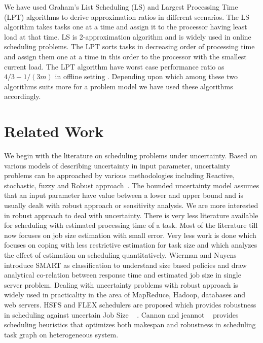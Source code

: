 \documentclass[10pt, conference, compsocconf]{IEEEtran}
\begin{document}
We have used  Graham's List Scheduling (LS) and Largest Processing Time (LPT) algorithms to derive approximation ratios in different scenarios. The LS algorithm takes tasks one at a time and assign  it to the processor having least load at that time. LS is 2-approximation algorithm and is widely used in online scheduling problems.  The LPT sorts tasks in decreasing order of processing time and assign them one at a time in this order to the processor with the smallest current load. The LPT algorithm have worst case performance ratio as $4/3-1/(3m) $ in offline setting
. Depending upon which among these two algorithms suits more for a problem model we have used these algorithms accordingly.

\section{Related Work}
We begin with the literature on scheduling problems under uncertainty. Based on various models of describing uncertainty in input parameter, uncertainty problems can be approached by various methodologies including Reactive, stochastic, fuzzy and Robust approach~\cite{DBLP:journals/cce/LiI08}. The bounded uncertainty model assumes that an input parameter have value between a lower and upper bound and is usually dealt with robust approach or sensitivity analysis. We are more interested in robust approach to deal with uncertainty. There is very less literature available for scheduling with estimated processing time of a task. Most of the literature till now focuses on job size estimation with small error. Very less work is done which focuses on coping with less restrictive estimation for task size and which analyzes the effect of estimation on scheduling quantitatively. Wierman and Nuyens~\cite{conf/sigmetrics/WiermanN08} introduce  SMART as classification to understand size based policies and draw analytical co-relation between response time and estimated job size in single server problem. Dealing with uncertainty problems with robust approach
is widely used in practicality in the area of MapReduce, Hadoop, databases and web servers. HSFS and FLEX  schedulers are proposed which provides robustness in scheduling against uncertain Job Size ~\cite{Wolf:2010:FSA:2023718.2023720}  \cite{6691554}. Cannon and jeannot ~\cite{cj09c} provides scheduling heuristics that optimizes both makespan and robustness in scheduling task graph on heterogeneous system.
\end{document}
